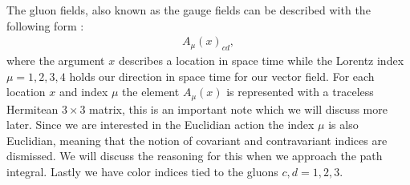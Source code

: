 \documentclass[english,twoside,openright]{UH_TCM_MSc}
\begin{document}
The gluon fields, also known as the gauge fields can be described with the following form \cite[p.~26]{gattringer2009quantum}:
\begin{align}
    A_\mu(x)_{cd},
\end{align}
where the argument $x$ describes a location in space time while the Lorentz index $\mu = 1,2,3,4$ holds our direction in space time for our vector field. For each location $x$ and index $\mu$ the element $A_\mu(x)$ is represented with a traceless Hermitean $3\times 3$ matrix, this is an important note which we will discuss more later. Since we are interested in the Euclidian action the index $\mu$ is also Euclidian, meaning that the notion of covariant and contravariant indices are dismissed. We will discuss the reasoning for this when we approach the path integral. Lastly we have color indices tied to the gluons $c,d = 1,2,3$.
\end{document}
